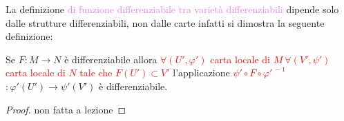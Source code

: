 \begin{center}
        \end{center}
        \newpage
        La definizione \textcolor{violet}{di funzione differenziabile tra varietà differenziabili} dipende solo dalle strutture differenziabili, non dalle carte infatti si dimostra la seguente definizione:
        \begin{proposizione}
        \mbox{}

        Se $F \colon M \to N$ è differenziabile allora
        \textcolor{red}{$\forall (U', \varphi')$  carta locale di $ M \ \forall (V', \psi')$  carta locale di $N$ tale che $F(U') \subset V'$}
        l'applicazione \textcolor{red}{$\psi' \circ F \circ \varphi'^{\, -1}$} $\colon \varphi'(U') \to \psi'(V')$ è differenziabile.
        \end{proposizione}
        \begin{proof}
        non fatta a lezione
        \end{proof}

